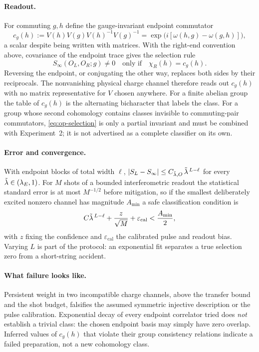 \paragraph{Readout.} For commuting $g,h$ define the gauge-invariant endpoint
commutator
\begin{equation}
  c_g(h):=V(h)V(g)V(h)^{-1}V(g)^{-1}
        =\exp\bigl(i[\omega(h,g)-\omega(g,h)]\bigr),
  \label{eq:op-commutator-invariant}
\end{equation}
a scalar despite being written with matrices. With the right-end convention
above, covariance of the endpoint trace gives the selection rule
\begin{equation}
  S_\infty(O_L,O_R;g)\neq0
  \quad\text{only if}\quad
  \chi_R(h)=c_g(h).
  \label{eq:op-selection}
\end{equation}
Reversing the endpoint, or conjugating the other way, replaces both sides by
their reciprocals. The nonvanishing physical charge channel therefore reads out
$c_g(h)$ with no matrix representative for $V$ chosen anywhere. For a finite
abelian group the table of $c_g(h)$ is the alternating bicharacter that labels
the class. For a group whose second cohomology contains classes invisible to
commuting-pair commutators, \eqref{eq:op-selection} is only a partial
invariant and must be combined with Experiment~2; it is not advertised as a
complete classifier on its own.

\paragraph{Error and convergence.} With endpoint blocks of total width $\ell$,
$\lvert S_L-S_\infty\rvert\le C_{\tilde{\lambda},O}\,\tilde{\lambda}^{\,L-\ell}$ for every
$\tilde{\lambda}\in(\lambda_E,1)$. For $M$ shots of a bounded interferometric readout the
statistical standard error is at most $M^{-1/2}$ before mitigation, so if the
smallest deliberately excited nonzero channel has magnitude $A_{\min}$ a safe
classification condition is
\begin{equation}
  C\tilde{\lambda}^{\,L-\ell}+\frac{z}{\sqrt{M}}+\varepsilon_{\mathrm{cal}}
  <\frac{A_{\min}}{2},
  \label{eq:op-string-budget}
\end{equation}
with $z$ fixing the confidence and $\varepsilon_{\mathrm{cal}}$ the calibrated
pulse and readout bias. Varying $L$ is part of the protocol: an exponential fit
separates a true selection zero from a short-string accident.

\paragraph{What failure looks like.} Persistent weight in two incompatible
charge channels, above the transfer bound and the shot budget, falsifies the
assumed symmetric injective description or the pulse calibration. Exponential
decay of every endpoint correlator tried does \emph{not} establish a trivial
class: the chosen endpoint basis may simply have zero overlap. Inferred values
of $c_g(h)$ that violate their group consistency relations indicate a failed
preparation, not a new cohomology class.

